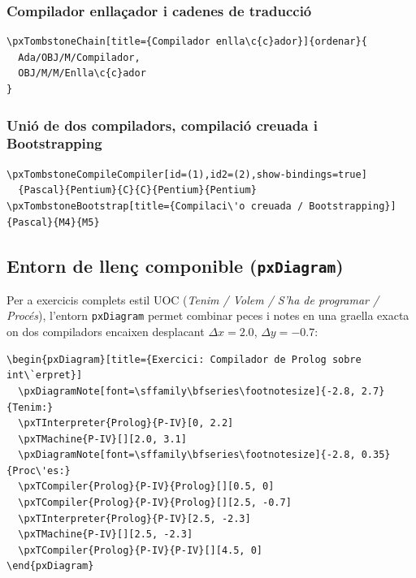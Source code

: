 \documentclass[11pt,a4paper]{article}
\begin{document}
\subsubsection*{Compilador enlla\c{c}ador i cadenes de traducci\'o}
\begin{verbatim}
\pxTombstoneChain[title={Compilador enlla\c{c}ador}]{ordenar}{
  Ada/OBJ/M/Compilador,
  OBJ/M/M/Enlla\c{c}ador
}
\end{verbatim}

\subsubsection*{Uni\'o de dos compiladors, compilaci\'o creuada i Bootstrapping}
\begin{verbatim}
\pxTombstoneCompileCompiler[id=(1),id2=(2),show-bindings=true]
  {Pascal}{Pentium}{C}{C}{Pentium}{Pentium}
\pxTombstoneBootstrap[title={Compilaci\'o creuada / Bootstrapping}]{Pascal}{M4}{M5}
\end{verbatim}


\subsection{Entorn de llen\c{c} componible (\texttt{pxDiagram})}
Per a exercicis complets estil UOC (\emph{Tenim / Volem / S'ha de programar / Proc\'es}),
l'entorn \texttt{pxDiagram} permet combinar peces i notes en una graella exacta on
dos compiladors encaixen desplacant $\Delta x = 2.0$, $\Delta y = -0.7$:

\begin{verbatim}
\begin{pxDiagram}[title={Exercici: Compilador de Prolog sobre int\`erpret}]
  \pxDiagramNote[font=\sffamily\bfseries\footnotesize]{-2.8, 2.7}{Tenim:}
  \pxTInterpreter{Prolog}{P-IV}[0, 2.2]
  \pxTMachine{P-IV}[][2.0, 3.1]
  \pxDiagramNote[font=\sffamily\bfseries\footnotesize]{-2.8, 0.35}{Proc\'es:}
  \pxTCompiler{Prolog}{P-IV}{Prolog}[][0.5, 0]
  \pxTCompiler{Prolog}{P-IV}{Prolog}[][2.5, -0.7]
  \pxTInterpreter{Prolog}{P-IV}[2.5, -2.3]
  \pxTMachine{P-IV}[][2.5, -2.3]
  \pxTCompiler{Prolog}{P-IV}{P-IV}[][4.5, 0]
\end{pxDiagram}
\end{verbatim}
\end{document}
